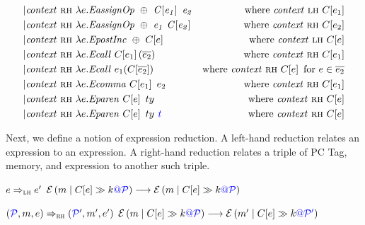 \documentclass[acmsmall,review,anonymous]{acmart}\settopmatter{printfolios=true,printccs=false,printacmref=false}
\begin{document}
\[\begin{aligned}
| & \mathit{context} ~ \rh ~ \lambda \expr.\assignop{\oplus}{\ctx{\expr_1}}{\expr_2} & \textnormal{where } \mathit{context} ~ \lh ~ \ctx{\expr_1} \\ %
| & \mathit{context} ~ \rh ~ \lambda \expr.\assignop{\oplus}{\expr_1}{\ctx{\expr_2}} & \textnormal{where } \mathit{context} ~ \rh ~ \ctx{\expr_2} \\ %
| & \mathit{context} ~ \rh ~ \lambda \expr.\postinc{\oplus}{\ctx{\expr}} & \textnormal{where } \mathit{context} ~  \lh ~ \ctx{\expr} \\ %
| & \mathit{context} ~ \rh ~ \lambda \expr.\call{\ctx{\expr_1}}{\overline{\expr_2}} & \textnormal{where } \mathit{context} ~  \rh ~ \ctx{\expr_1} \\ %
| & \mathit{context} ~ \rh ~ \lambda \expr.\call{\expr_1}{\ctx{\overline{\expr_2}}} & \textnormal{where } \mathit{context} ~  \rh ~ \ctx{\expr} \textnormal{ for } \expr \in \overline{\expr_2} \\ %
| & \mathit{context} ~ \rh ~ \lambda \expr.\comma{\ctx{\expr_1}}{\expr_2} & \textnormal{where } \mathit{context} ~  \rh ~ \ctx{\expr_1} \\ %
| & \mathit{context} ~ \rh ~ \lambda \expr.\paren{\ctx{\expr}}{\type}{} & \textnormal{where } \mathit{context} ~  \rh ~ \ctx{\expr} \\ %
| & \mathit{context} ~ \rh ~ \lambda \expr.\paren{\ctx{\expr}}{\type}{\gentag} & \textnormal{where } \mathit{context} ~ \rh ~ \ctx{\expr} \\ %
\end{aligned}\]

Next, we define a notion of expression reduction. A left-hand reduction relates an expression to an expression.
A right-hand reduction relates a triple of PC Tag, memory, and expression to another such triple.


            {\(e \Rightarrow_{\textnormal{\sc lh}} e'\)}
            {\(\mathcal{E}\left(m \mid C \!\left[e\right] \gg k {\color{blue} @ \mathcal{\color{blue} P}}\right) \longrightarrow \mathcal{E}\left(m \mid C \!\left[e\right] \gg k {\color{blue} @ \mathcal{\color{blue} P}}\right)\)}

            {\((\mathcal{\color{blue} P}, m, e) \Rightarrow_{\textnormal{\sc rh}} (\mathcal{\color{blue} P}', m', e')\)}
            {\(\mathcal{E}\left(m \mid C \!\left[e\right] \gg k {\color{blue} @ \mathcal{\color{blue} P}}\right) \longrightarrow \mathcal{E}\left(m' \mid C \!\left[e\right] \gg k {\color{blue} @ \mathcal{\color{blue} P}'}\right)\)}
            
\end{document}
